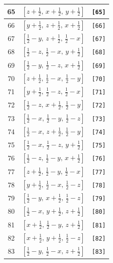 \documentclass[fleqn,8pt]{jsarticle}
\begin{document}
\begin{longtable}{ccc}
65 & $\left[ z + \frac{1}{2},\, x + \frac{1}{2},\, y + \frac{1}{2} \right]$ & {\tt [65]} \\ \hline
66 & $\left[ y + \frac{1}{2},\, z + \frac{1}{2},\, x + \frac{1}{2} \right]$ & {\tt [66]} \\ \hline
67 & $\left[ \frac{1}{2} - y,\, z + \frac{1}{2},\, \frac{1}{2} - x \right]$ & {\tt [67]} \\ \hline
68 & $\left[ \frac{1}{2} - z,\, \frac{1}{2} - x,\, y + \frac{1}{2} \right]$ & {\tt [68]} \\ \hline
69 & $\left[ \frac{1}{2} - y,\, \frac{1}{2} - z,\, x + \frac{1}{2} \right]$ & {\tt [69]} \\ \hline
70 & $\left[ z + \frac{1}{2},\, \frac{1}{2} - x,\, \frac{1}{2} - y \right]$ & {\tt [70]} \\ \hline
71 & $\left[ y + \frac{1}{2},\, \frac{1}{2} - z,\, \frac{1}{2} - x \right]$ & {\tt [71]} \\ \hline
72 & $\left[ \frac{1}{2} - z,\, x + \frac{1}{2},\, \frac{1}{2} - y \right]$ & {\tt [72]} \\ \hline
73 & $\left[ \frac{1}{2} - x,\, \frac{1}{2} - y,\, \frac{1}{2} - z \right]$ & {\tt [73]} \\ \hline
74 & $\left[ \frac{1}{2} - x,\, z + \frac{1}{2},\, \frac{1}{2} - y \right]$ & {\tt [74]} \\ \hline
75 & $\left[ \frac{1}{2} - x,\, \frac{1}{2} - z,\, y + \frac{1}{2} \right]$ & {\tt [75]} \\ \hline
76 & $\left[ \frac{1}{2} - z,\, \frac{1}{2} - y,\, x + \frac{1}{2} \right]$ & {\tt [76]} \\ \hline
77 & $\left[ z + \frac{1}{2},\, \frac{1}{2} - y,\, \frac{1}{2} - x \right]$ & {\tt [77]} \\ \hline
78 & $\left[ y + \frac{1}{2},\, \frac{1}{2} - x,\, \frac{1}{2} - z \right]$ & {\tt [78]} \\ \hline
79 & $\left[ \frac{1}{2} - y,\, x + \frac{1}{2},\, \frac{1}{2} - z \right]$ & {\tt [79]} \\ \hline
80 & $\left[ \frac{1}{2} - x,\, y + \frac{1}{2},\, z + \frac{1}{2} \right]$ & {\tt [80]} \\ \hline
81 & $\left[ x + \frac{1}{2},\, \frac{1}{2} - y,\, z + \frac{1}{2} \right]$ & {\tt [81]} \\ \hline
82 & $\left[ x + \frac{1}{2},\, y + \frac{1}{2},\, \frac{1}{2} - z \right]$ & {\tt [82]} \\ \hline
83 & $\left[ \frac{1}{2} - y,\, \frac{1}{2} - x,\, z + \frac{1}{2} \right]$ & {\tt [83]} \\ \hline

\end{longtable}
\end{document}
